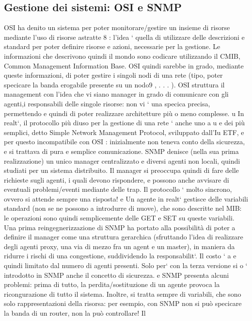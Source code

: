 \documentclass[a4paper,12pt]{article}
\begin{document}
\subsection{Gestione dei sistemi: OSI e SNMP}
OSI ha denito un sistema per poter monitorare/gestire un insieme di risorse
mediante l'uso di risorse astratte 8 : l'idea ` quella di utilizzare delle descrizioni
e
standard per poter definire risorse e azioni, necessarie per la gestione. Le informazioni che descrivono quindi il mondo
sono codicare utilizzando il CMIB,
Common Management Information Base. OSI quindi sarebbe in grado, mediante queste informazioni, di poter gestire i
singoli nodi di una rete (tipo, poter
specicare la banda erogabile presente su un nodo9 , . . . ). OSI struttura il management con l'idea che vi siano manager
in grado di comunicare con gli agenti,i
responsabili delle singole risorse: non vi ` una specica precisa, permettendo
e
quindi di poter realizzare architetture più o meno complesse.
u
In realt`, il protocollo più diuso per la gestione di una rete ` anche uno
a
u
e
dei più semplici, detto Simple Network Management Protocol, sviluppato dall'Iu
ETF, e per questo incompatibile con OSI : inizialmente non teneva conto della
sicurezza, e si trattava di pura e semplice comunicazione.
SNMP denisce (nella sua prima realizzazione) un unico manager centralizzato e diversi agenti non locali, quindi studiati
per un sistema distribuito. Il
manager si preoccupa quindi di fare delle richieste sugli agenti, i quali devono
rispondere, e possono anche avvisare di eventuali problemi/eventi mediante delle
trap. Il protocollo ` molto sincrono, ovvero si attende sempre una risposta!
e
Un agente in realt` gestisce delle variabili standard (non se ne possono
a
introdurre di nuove), che sono descritte nel MIB: le operazioni sono quindi
semplicemente delle GET e SET su queste variabili.
Una prima reingegnerizzazione di SNMP ha portato alla possibilità di poter
a
definire il manager come una struttura gerarchica (sfruttando l'idea di realizzare
degli agenti proxy, una via di mezzo fra un agent e un master), in maniera da
ridurre i rischi di una congestione, suddividendo la responsabilit`. Il costo `
a
e
quindi limitato dal numero di agenti presenti. Solo per` con la terza versione si
o
` introdotto in SNMP anche il concetto di sicurezza.
e
SNMP presenta alcuni problemi: prima di tutto, la perdita/sostituzione di
un agente provoca la ricongurazione di tutto il sistema. Inoltre, si tratta sempre di variabili, che sono solo
rappresentazioni della risorsa: per esempio, con
SNMP non si può specicare la banda di un router, non la può controllare! Il
\end{document}
